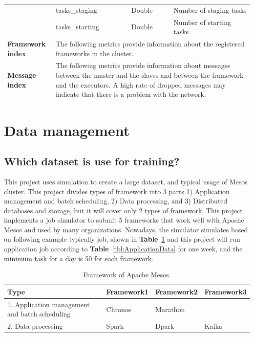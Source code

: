 \documentclass[12pt,oneside,openright,a4paper]{cpe-english-project}
\begin{document}
\begin{table}[!h]
\begin{tabular}{|p{}|p{}|p{}|p{}|}
    \cline{2-4} & tasks\_staging & Double & Number of staging tasks \\ 
    \cline{2-4} & tasks\_starting & Double & Number of starting tasks \\ 
    \hline
    \textbf{Framework index} & \multicolumn{3}{p{0.7\textwidth}|}{ The following metrics provide information about the registered frameworks in the cluster.} \\ 
    \hline
    \textbf{Message index} & \multicolumn{3}{p{0.7\textwidth}|}{ The following metrics provide information about messages between the master and the slaves and between the framework and the executors. A high rate of dropped messages may indicate that there is a problem with the network.} \\ 
    \hline
  \end{tabular}
\end{table}

\newpage

\section{Data management }

\subsection{Which dataset is use for training?}
This project uses simulation to create a large dataset, and typical usage of Mesos cluster. This project divides types of framework into 3 parts 1) Application management and batch scheduling, 2) Data processing, and 3) Distributed databases and storage, but it will cover only 2 types of framework. This project implements a job simulator to submit 5 frameworks that work well with Apache Mesos and used by many organizations. Nowadays, the simulator simulates based on following example typically job, shown in \textbf{Table}~\ref{tbl:MesosFramework} and this project will run application job according to \textbf{Table}~\ref{tbl:ApplicationData} for one week, and the minimum task for a day is 50 for each framework.

\begin{table}[!h]
  \caption{Framework of Apache Mesos.}\label{tbl:MesosFramework}
    \begin{tabular}{@{}|p{}|p{}|p{}|p{}|}
    \hline
    \textbf{Type} & \textbf{Framework1} & \textbf{Framework2} & \textbf{Framework3}\\
    \hline
    1. Application management and batch scheduling & Chronos & Marathon & \\
    \hline
    2. Data processing & Spark & Dpark & Kafka\\
    \hline
  \end{tabular}
\end{table}
\end{document}
